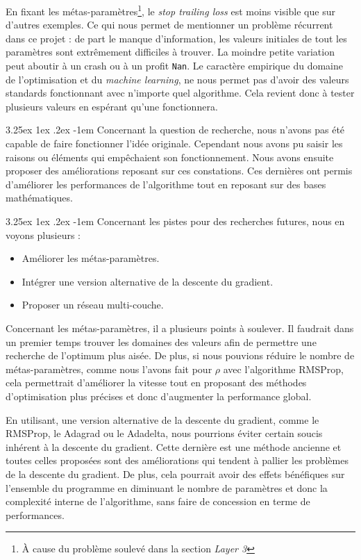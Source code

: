 \documentclass[a4paper, 11pt]{article}
\makeatletter
\renewcommand\paragraph{\@startsection{paragraph}{5}{\z@}%
  {3.25ex \@plus1ex \@minus.2ex}%
  {-1em}%
  {\normalfont\normalsize\bfseries}}
\makeatother
\begin{document}
En fixant les métas-paramètres\footnote{À cause du problème soulevé dans la section \textit{Layer 3}}, le \textit{stop trailing loss} est moins visible
que sur d'autres exemples. Ce qui nous permet de mentionner un problème récurrent dans ce projet : de part le manque d'information, les valeurs initiales
de tout les paramètres sont extrêmement difficiles à trouver. La moindre petite variation peut aboutir à un crash ou à un profit \texttt{Nan}. Le caractère
empirique du domaine de l'optimisation et du \textit{machine learning}, ne nous permet pas d'avoir des valeurs standards fonctionnant avec n'importe quel
algorithme. Cela revient donc à tester plusieurs valeurs en espérant qu'une fonctionnera.

\paragraph{}
Concernant la question de recherche, nous n'avons pas été capable de faire fonctionner l'idée originale. Cependant nous avons pu saisir les raisons ou 
éléments qui empêchaient son fonctionnement. Nous avons ensuite proposer des améliorations reposant sur ces constations. Ces dernières ont permis 
d'améliorer les performances de l'algorithme tout en reposant sur des bases mathématiques.

\paragraph{}
Concernant les pistes pour des recherches futures, nous en voyons plusieurs :
\begin{itemize}
 \item Améliorer les métas-paramètres.
 \item Intégrer une version alternative de la descente du gradient.
 \item Proposer un réseau multi-couche.
\end{itemize}

Concernant les métas-paramètres, il a plusieurs points à soulever. Il faudrait dans un premier temps trouver les domaines des valeurs afin de permettre
une recherche de l'optimum plus aisée. De plus, si nous pouvions réduire le nombre de métas-paramètres, comme nous l'avons fait pour $\rho$ avec l'algorithme
RMSProp, cela permettrait d'améliorer la vitesse tout en proposant des méthodes d'optimisation plus précises et donc d'augmenter la performance global.

En utilisant, une version alternative de la descente du gradient, comme le RMSProp, le Adagrad ou le Adadelta, nous pourrions éviter certain soucis
inhérent à la descente du gradient. Cette dernière est une méthode ancienne et toutes celles proposées sont des améliorations qui tendent à pallier les
problèmes de la descente du gradient. De plus, cela pourrait avoir des effets bénéfiques sur l'ensemble du programme en diminuant le nombre de paramètres
et donc la complexité interne de l'algorithme, sans faire de concession en terme de performances.
\end{document}
